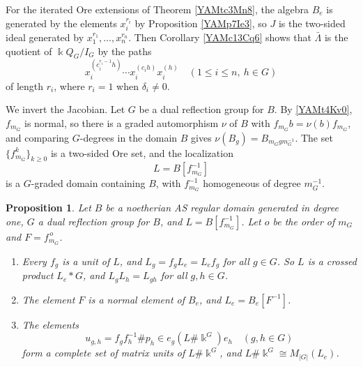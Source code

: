 \documentclass[reqno]{amsart}
\numberwithin{equation}{section}
\newtheorem{proposition}[equation]{Proposition}
\theoremstyle{definition}
\theoremstyle{remark}
\theoremstyle{plain}
\newcommand{\kk}{\Bbbk}
\begin{document}
For the iterated Ore extensions of Theorem \ref{YAMtc3Mn8}, the algebra $B_e$ is generated by the elements $x_i^{r_i}$ by Proposition \ref{YAMp7Ie3}, so $J$ is the two-sided ideal generated by $x_1^{r_1},\dots,x_n^{r_n}$. Then Corollary \ref{YAMc13Cq6} shows that $\bar\Lambda$ is the quotient of $\kk Q_G/I_G$ by the paths
\[
x_i^{(c_i^{r_i-1}h)}\cdots x_i^{(c_ih)}x_i^{(h)}\quad(1\le i\le n,\ h\in G)
\]
of length $r_i$, where $r_i=1$ when $\delta_i\neq0$.

We invert the Jacobian. Let $G$ be a dual reflection group for $B$. By \eqref{YAMt4Kv0}, $f_{m_G}$ is normal, so there is a graded automorphism $\nu$ of $B$ with $f_{m_G}b=\nu(b)f_{m_G}$, and comparing $G$-degrees in the domain $B$ gives $\nu(B_g)=B_{m_Ggm_G^{-1}}$. The set $\{f_{m_G}^k\}_{k\ge0}$ is a two-sided Ore set, and the localization
\[
L=B[f_{m_G}^{-1}]
\]
is a $G$-graded domain containing $B$, with $f_{m_G}^{-1}$ homogeneous of degree $m_G^{-1}$.

\begin{proposition}\label{YAMlo4Pe9}
Let $B$ be a noetherian AS regular domain generated in degree one, $G$ a dual reflection group for $B$, and $L=B[f_{m_G}^{-1}]$. Let $o$ be the order of $m_G$ and $F=f_{m_G}^{\,o}$.
\begin{enumerate}
\item Every $f_g$ is a unit of $L$, and $L_g=f_gL_e=L_ef_g$ for all $g\in G$. So $L$ is a crossed product $L_e*G$, and $L_gL_h=L_{gh}$ for all $g,h\in G$.
\item The element $F$ is a normal element of $B_e$, and $L_e=B_e[F^{-1}]$.
\item The elements
\[
u_{g,h}=f_gf_h^{-1}\#p_h\in e_g(L\#\kk^G)e_h\quad(g,h\in G)
\]
form a complete set of matrix units of $L\#\kk^G$, and $L\#\kk^G\cong M_{|G|}(L_e)$.
\end{enumerate}
\end{proposition}
\end{document}
